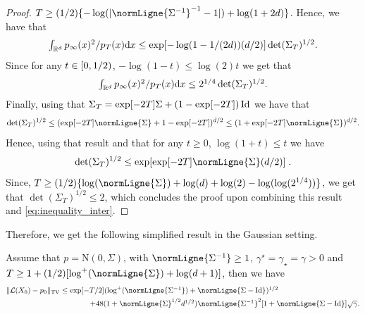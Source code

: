 \begin{proof}
   $T \geq (1/2) \{-\log(\absLigne{\normLigne{\Sigma^{-1}}^{-1}-1}) + \log(1 +
   2d)\}$. Hence, we have that
   \begin{equation}
      \textstyle{
        \int_{\mathbb{R}^d} p_\infty(x)^2/p_T(x) \mathrm{d}x \leq \exp[-\log(1-1/(2d))(d/2)] \det(\Sigma_T)^{1/2} .
        }
   \end{equation}
Since for any $t \in \left[0,1/2\right)$, $-\log(1-t)\leq \log(2)t$ we get that
\begin{equation}
  \label{eq:inequality_inter}
    \textstyle{
        \int_{\mathbb{R}^d} p_\infty(x)^2/p_T(x) \mathrm{d}x \leq 2^{1/4} \det(\Sigma_T)^{1/2} .
        }  
\end{equation}
Finally, using that $\Sigma_T = \exp[-2T] \Sigma + (1 - \exp[-2T]) \operatorname{Id}$ we have that
\begin{equation}
  \det(\Sigma_T)^{1/2} \leq (\exp[-2T]\normLigne{\Sigma} + 1 - \exp[-2T])^{d/2} \leq (1 + \exp[-2T] \normLigne{\Sigma})^{d/2} .
\end{equation}
Hence, using that result and that for any $t \geq 0$, $\log(1+t) \leq t$ we have
\begin{equation}
  \det(\Sigma_T)^{1/2} \leq \exp[\exp[-2T]\normLigne{\Sigma}(d/2)] \eqsp . 
\end{equation}
Since,
$T \geq (1/2) \{ \log(\normLigne{\Sigma}) + \log(d) + \log(2) -
\log(\log(2^{1/4})) \}$, we get that $\det(\Sigma_T)^{1/2} \leq 2$, which
concludes the proof upon combining this result and \eqref{eq:inequality_inter}.
\end{proof}

Therefore, we get the following simplified result in the Gaussian setting.

\begin{corollary}
  Assume that $p = \mathrm{N}(0, \Sigma)$, with
  $\normLigne{\Sigma^{-1}} \geq 1$, $\gamma^\star = \gamma_\star= \gamma >0$ and
  $T \geq 1 + (1/2)[\log^+(\normLigne{\Sigma}) + \log(d +1)]$, then we have
  \begin{align}
    \tvnormLigne{\mathcal{L}(X_0) - p_0} &\leq \textstyle{\exp[-T/2] (\log^+(\normLigne{\Sigma^{-1}}) + \normLigne{\Sigma - \Id})^{1/2}} \\
    & \qquad \qquad  \textstyle{+ 48  (1+\normLigne{\Sigma}^{1/2}d^{1/2}) \normLigne{\Sigma^{-1}}^2 [1 +  \normLigne{\Sigma - \Id} ]\sqrt{\gamma}  .} 
  \end{align}  
\end{corollary}

